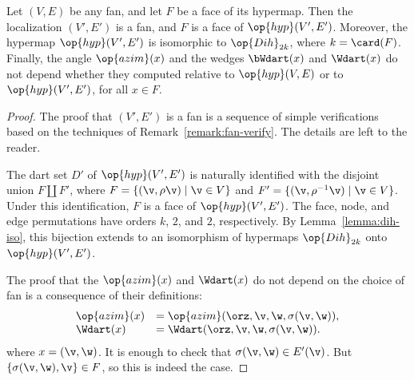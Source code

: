 \begin{lemma}[localization]
\label{lemma:localization}
Let $(V,E)$ be any fan, and let $F$ be a face of its hypermap.  Then
the localization $(V',E')$ is a fan, and $F$ is a face of
$\op{hyp}(V',E')$.  Moreover, the hypermap $\op{hyp}(V',E')$ is
isomorphic to $\op{Dih}_{2k}$, where $k= \card(F)$.  Finally, the angle
$\op{azim}(x)$ and the wedges $\bWdart(x)$ and $\Wdart(x)$ do not depend
whether they computed relative to $\op{hyp}(V,E)$ or to
$\op{hyp}(V',E')$, for all $x\in F$.
\end{lemma}



\begin{proof}
The proof that $(V',E')$ is a fan is a sequence of simple
verifications based on the techniques of
Remark~\ref{remark:fan-verify}.  The details are left to the reader.

The dart set $D'$ of $\op{hyp}(V',E')$ is naturally identified with
the disjoint union $F\coprod F'$, where $F = \{(\v,\rho\v) \mid \v\in
V\}$ and $F'=\{(\v,\rho^{-1}\v) \mid \v\in V\}$.  Under this
identification, $F$ is a face of $\op{hyp}(V',E')$.  The face, node,
and edge permutations have orders $k$, $2$, and $2$, respectively.  By
Lemma~\ref{lemma:dih-iso}, this bijection extends to an isomorphism of
hypermaps $\op{Dih}_{2k}$ onto $\op{hyp}(V',E')$.

The proof that the $\op{azim}(x)$ and $\Wdart(x)$ do not depend on the
choice of fan is a consequence of their definitions:
\begin{displaymath}
\begin{array}{lll}
\op{azim}(x) &= \op{azim}(\orz,\v,\w,\sigma(\v,\w)),\\
\Wdart(x) &= \Wdart(\orz,\v,\w,\sigma(\v,\w)).\\
\end{array}
\end{displaymath}
where $x = (\v,\w)$.  It is enough to check that $\sigma(\v,\w)\in
E'(\v)$.  But $\{\sigma(\v,\w),\v\}\in F$, so this is indeed the case.
\end{proof}




